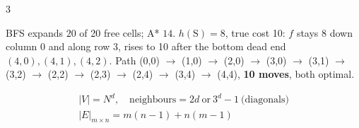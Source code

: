 \begin{multicols}{3}
\begin{center}
\end{center}
BFS expands $20$ of 20 free cells; A* $14$. $h(\text{S})=8$, true cost 10: $f$ stays 8 down column 0 and along row 3, rises to 10 after the bottom dead end $(4,0),(4,1),(4,2)$. Path (0,0) $\to$ (1,0) $\to$ (2,0) $\to$ (3,0) $\to$ (3,1) $\to$ (3,2) $\to$ (2,2) $\to$ (2,3) $\to$ (2,4) $\to$ (3,4) $\to$ (4,4), \textbf{10 moves}, both optimal. \chk
\begin{fbx}
\begin{gather*}|V|=N^{d},\quad \text{neighbours}=2d\ \text{or}\ 3^{d}-1\ \text{(diagonals)}\\ |E|_{m\times n}=m(n-1)+n(m-1)\end{gather*}
 \chk
\end{fbx}


\end{multicols}
